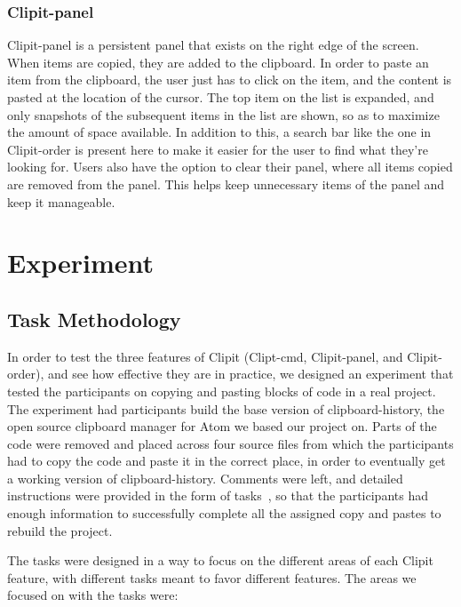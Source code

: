 \documentclass{acm_proc_article-sp}
\begin{document}
\subsubsection{Clipit-panel}\label{sec:features_panel}

Clipit-panel is a persistent panel that exists on the right edge of the screen. When items are copied, they are added to the clipboard. In order to paste an item from the clipboard, the user just has to click on the item, and the content is pasted at the location of the cursor. The top item on the list is expanded, and only snapshots of the subsequent items in the list are shown, so as to maximize the amount of space available. In addition to this, a search bar like the one in Clipit-order is present here to make it easier for the user to find what they're looking for. Users also have the option to clear their panel, where all items copied are removed from the panel. This helps keep unnecessary items of the panel and keep it manageable.

\section{Experiment}\label{sec:experiment}

\subsection{Task Methodology}\label{sec:task}
In order to test the three features of Clipit (Clipt-cmd, Clipit-panel, and Clipit-order), and see how  effective they are in practice, we designed an experiment that tested the participants on copying and pasting blocks of code in a real project. The experiment had participants build the base version of clipboard-history, the open source clipboard manager for Atom we based our project on. Parts of the code were removed and placed across four source files from which the participants had to copy the code and paste it in the correct place, in order to eventually get a working version of clipboard-history. Comments were left, and detailed instructions were provided in the form of tasks~\cite{Tasks}, so that the participants had enough information to successfully complete all the assigned copy and pastes to rebuild the project.

The tasks were designed in a way to focus on the different areas of each Clipit feature, with different tasks meant to favor different features. The areas we focused on with the tasks were:
\end{document}
